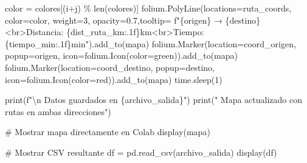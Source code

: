 \documentclass[
  letterpaper,
  DIV=11,
  numbers=noendperiod]{scrreprt}
\newenvironment{Shaded}{\begin{snugshade}}{\end{snugshade}}
\newcommand{\BuiltInTok}[1]{\textcolor[rgb]{0.00,0.23,0.31}{#1}}
\newcommand{\CharTok}[1]{\textcolor[rgb]{0.13,0.47,0.30}{#1}}
\newcommand{\CommentTok}[1]{\textcolor[rgb]{0.37,0.37,0.37}{#1}}
\newcommand{\DecValTok}[1]{\textcolor[rgb]{0.68,0.00,0.00}{#1}}
\newcommand{\ErrorTok}[1]{\textcolor[rgb]{0.68,0.00,0.00}{#1}}
\newcommand{\FloatTok}[1]{\textcolor[rgb]{0.68,0.00,0.00}{#1}}
\newcommand{\NormalTok}[1]{\textcolor[rgb]{0.00,0.23,0.31}{#1}}
\newcommand{\OperatorTok}[1]{\textcolor[rgb]{0.37,0.37,0.37}{#1}}
\newcommand{\SpecialCharTok}[1]{\textcolor[rgb]{0.37,0.37,0.37}{#1}}
\newcommand{\SpecialStringTok}[1]{\textcolor[rgb]{0.13,0.47,0.30}{#1}}
\newcommand{\StringTok}[1]{\textcolor[rgb]{0.13,0.47,0.30}{#1}}
\begin{document}
\begin{Shaded}
\begin{Highlighting}[]
\NormalTok{                        color }\OperatorTok{=}\NormalTok{ colores[(i}\OperatorTok{+}\NormalTok{j) }\OperatorTok{\%} \BuiltInTok{len}\NormalTok{(colores)]}
\NormalTok{                        folium.PolyLine(locations}\OperatorTok{=}\NormalTok{ruta\_coords, color}\OperatorTok{=}\NormalTok{color,}
\NormalTok{                                        weight}\OperatorTok{=}\DecValTok{3}\NormalTok{, opacity}\OperatorTok{=}\FloatTok{0.7}\NormalTok{,tooltip}\OperatorTok{=}
                                        \SpecialStringTok{f"}\SpecialCharTok{\{}\NormalTok{origen}\SpecialCharTok{\}}\SpecialStringTok{ → }\SpecialCharTok{\{}\NormalTok{destino}\SpecialCharTok{\}}\SpecialStringTok{\textless{}br\textgreater{}Distancia:}
\ErrorTok{                                        \{dist\_ruta\_km:.1f\}km\textless{}br\textgreater{}Tiempo:}
\NormalTok{                                        \{tiempo\_min:}\FloatTok{.1}\ErrorTok{f}\NormalTok{\}min}\StringTok{").add\_to(mapa)}
\ErrorTok{                        folium.Marker}\NormalTok{(location}\OperatorTok{=}\NormalTok{coord\_origen, popup}\OperatorTok{=}\NormalTok{origen, }
\NormalTok{                            icon}\OperatorTok{=}\NormalTok{folium.Icon(color}\OperatorTok{=}\StringTok{\textquotesingle{}green\textquotesingle{}}\NormalTok{)).add\_to(mapa)}
\NormalTok{                        folium.Marker(location}\OperatorTok{=}\NormalTok{coord\_destino, popup}\OperatorTok{=}\NormalTok{destino, }
\NormalTok{                            icon}\OperatorTok{=}\NormalTok{folium.Icon(color}\OperatorTok{=}\StringTok{\textquotesingle{}red\textquotesingle{}}\NormalTok{)).add\_to(mapa)}
\NormalTok{                time.sleep(}\DecValTok{1}\NormalTok{)}

\BuiltInTok{print}\NormalTok{(}\SpecialStringTok{f"}\CharTok{\textbackslash{}n}\SpecialStringTok{ Datos guardados en }\SpecialCharTok{\{}\NormalTok{archivo\_salida}\SpecialCharTok{\}}\SpecialStringTok{"}\NormalTok{)}
\BuiltInTok{print}\NormalTok{(}\StringTok{" Mapa actualizado con rutas en ambas direcciones"}\NormalTok{)}

\CommentTok{\# Mostrar mapa directamente en Colab}
\NormalTok{display(mapa)}

\CommentTok{\# Mostrar CSV resultante}
\NormalTok{df }\OperatorTok{=}\NormalTok{ pd.read\_csv(archivo\_salida)}
\NormalTok{display(df)}
\end{Highlighting}
\end{Shaded}


\chapter{}\label{section-2}
\end{document}
